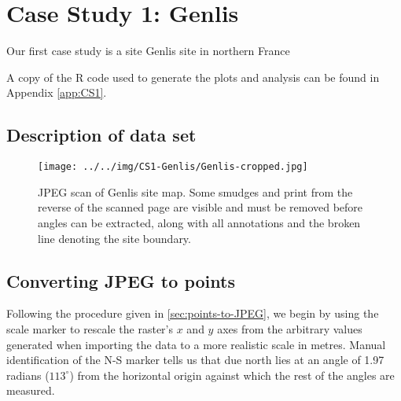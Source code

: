 \documentclass[../../ArchStats.tex]{subfiles}
\begin{document}
\section{Case Study 1: Genlis}
\label{sec:CS1}

Our first case study is a site Genlis site in northern France 

A copy of the R code used to generate the plots and analysis can be found in Appendix \ref{app:CS1}.

\subsection{Description of data set}

\begin{figure}[!h]
\centering
\caption{JPEG scan of Genlis site map. Some smudges and print from the reverse of the scanned page are visible and must be removed before angles can be extracted, along with all annotations and the broken line denoting the site boundary.}
\texttt{[image: ../../img/CS1-Genlis/Genlis-cropped.jpg]}
\end{figure}


\subsection{Converting JPEG to points}

Following the procedure given in \ref{sec:points-to-JPEG}, we begin by using the scale marker to rescale the raster's $x$ and $y$ axes from the arbitrary values generated when importing the data to a more realistic scale in metres. Manual identification of the N-S marker tells us that due north lies at an angle of 1.97 radians ($113^\circ$) from the horizontal origin against which the rest of the angles are measured.


 
\end{document}
